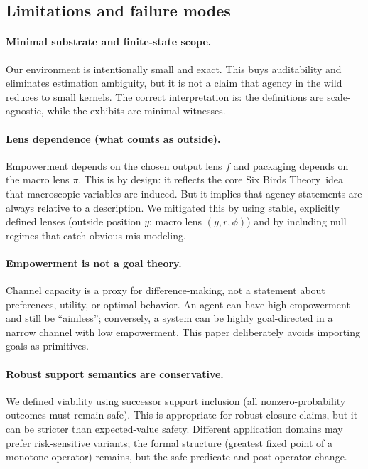 \documentclass[11pt]{article}
\newcommand{\SBT}{Six Birds Theory}
\begin{document}
\subsection{Limitations and failure modes}
\paragraph{Minimal substrate and finite-state scope.}
Our environment is intentionally small and exact. This buys auditability and eliminates estimation ambiguity, but it is not a claim that agency in the wild reduces to small kernels. The correct interpretation is: the definitions are scale-agnostic, while the exhibits are minimal witnesses.

\paragraph{Lens dependence (what counts as outside).}
Empowerment depends on the chosen output lens $f$ and packaging depends on the macro lens $\pi$. This is by design: it reflects the core \SBT\ idea that macroscopic variables are induced. But it implies that agency statements are always relative to a description. We mitigated this by using stable, explicitly defined lenses (outside position $y$; macro lens $(y,r,\phi)$) and by including null regimes that catch obvious mis-modeling.

\paragraph{Empowerment is not a goal theory.}
Channel capacity is a proxy for difference-making, not a statement about preferences, utility, or optimal behavior. An agent can have high empowerment and still be ``aimless''; conversely, a system can be highly goal-directed in a narrow channel with low empowerment. This paper deliberately avoids importing goals as primitives.

\paragraph{Robust support semantics are conservative.}
We defined viability using successor support inclusion (all nonzero-probability outcomes must remain safe). This is appropriate for robust closure claims, but it can be stricter than expected-value safety. Different application domains may prefer risk-sensitive variants; the formal structure (greatest fixed point of a monotone operator) remains, but the safe predicate and post operator change.
\end{document}
